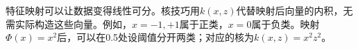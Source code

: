 特征映射可以让数据变得线性可分。核技巧用\(k(x,z)\)代替映射后向量的内积，无需实际构造这些向量。例如，\(x=-1,+1\)属于正类，\(x=0\)属于负类。映射\(\Phi(x)=x^2\)后，可以在0.5处设阈值分开两类；对应的核为\(k(x,z)=x^2z^2\)。

